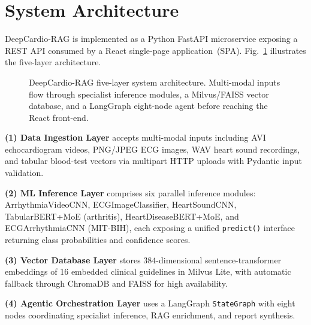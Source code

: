 \documentclass[journal,10pt,twoside]{IEEEtran}
\begin{document}
\section{System Architecture}
\label{sec:arch}

DeepCardio-RAG is implemented as a Python FastAPI microservice exposing a REST API
consumed by a React single-page application~(SPA).
Fig.~\ref{fig:arch} illustrates the five-layer architecture.

\begin{figure}[!t]
  \centering
  \caption{DeepCardio-RAG five-layer system architecture. Multi-modal inputs
    flow through specialist inference modules, a Milvus/FAISS vector database,
    and a LangGraph eight-node agent before reaching the React front-end.}
  \label{fig:arch}
\end{figure}

\textbf{(1) Data Ingestion Layer} accepts multi-modal inputs including AVI
echocardiogram videos, PNG/JPEG ECG images, WAV heart sound recordings, and tabular
blood-test vectors via multipart HTTP uploads with Pydantic input validation.

\textbf{(2) ML Inference Layer} comprises six parallel inference modules:
ArrhythmiaVideoCNN, ECGImageClassifier, HeartSoundCNN, TabularBERT+MoE
(arthritis), HeartDiseaseBERT+MoE, and ECGArrhythmiaCNN (MIT-BIH),
each exposing a unified \texttt{predict()} interface returning class probabilities
and confidence scores.

\textbf{(3) Vector Database Layer} stores $384$-dimensional sentence-transformer
embeddings of 16 embedded clinical guidelines in Milvus Lite, with automatic fallback
through ChromaDB and FAISS for high availability.

\textbf{(4) Agentic Orchestration Layer} uses a LangGraph \texttt{StateGraph} with
eight nodes coordinating specialist inference, RAG enrichment, and report synthesis.
\end{document}
